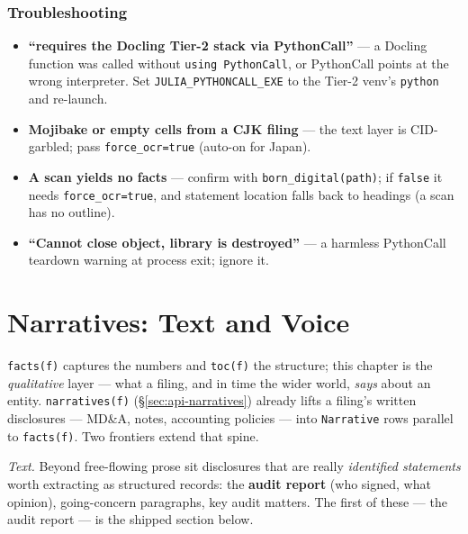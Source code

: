 \documentclass[11pt,a4paper]{report}
\begin{document}
\begin{subappendices}
\subsection{Troubleshooting}
\begin{itemize}[nosep]
  \item \textbf{``requires the Docling Tier-2 stack via PythonCall''} --- a Docling function was called without
    \texttt{using PythonCall}, or PythonCall points at the wrong interpreter. Set \texttt{JULIA\_PYTHONCALL\_EXE}
    to the Tier-2 venv's \texttt{python} and re-launch.
  \item \textbf{Mojibake or empty cells from a CJK filing} --- the text layer is CID-garbled; pass
    \texttt{force\_ocr=true} (auto-on for Japan).
  \item \textbf{A scan yields no facts} --- confirm with \texttt{born\_digital(path)}; if \texttt{false} it
    needs \texttt{force\_ocr=true}, and statement location falls back to headings (a scan has no outline).
  \item \textbf{``Cannot close object, library is destroyed''} --- a harmless PythonCall teardown warning at
    process exit; ignore it.
\end{itemize}

\end{subappendices}


\chapter{Narratives: Text and Voice}
\label{ch:narratives}

\texttt{facts(f)} captures the numbers and \texttt{toc(f)} the structure; this chapter is the
\emph{qualitative} layer --- what a filing, and in time the wider world, \emph{says} about an entity.
\texttt{narratives(f)} (\S\ref{sec:api-narratives}) already lifts a filing's written disclosures ---
MD\&A, notes, accounting policies --- into \texttt{Narrative} rows parallel to \texttt{facts(f)}. Two
frontiers extend that spine.

\emph{Text.} Beyond free-flowing prose sit disclosures that are really \emph{identified statements} worth
extracting as structured records: the \textbf{audit report} (who signed, what opinion), going-concern
paragraphs, key audit matters. The first of these --- the audit report --- is the shipped section below.
\end{document}
